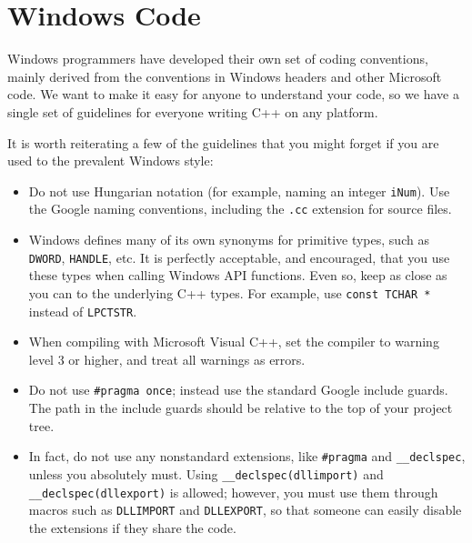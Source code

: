 
\section{Windows Code}\label{sec:windows-code}
Windows programmers have developed their own set of coding conventions, mainly derived from the conventions in Windows headers and other Microsoft code. We want to make it easy for anyone to understand your code, so we have a single set of guidelines for everyone writing C++ on any platform.

It is worth reiterating a few of the guidelines that you might forget if you are used to the prevalent Windows style:
\begin{itemize}
    \item Do not use Hungarian notation (for example, naming an integer \texttt{iNum}). Use the Google naming conventions, including the \texttt{.cc} extension for source files.
    \item Windows defines many of its own synonyms for primitive types, such as \texttt{DWORD}, \texttt{HANDLE}, etc. It is perfectly acceptable, and encouraged, that you use these types when calling Windows API functions. Even so, keep as close as you can to the underlying C++ types. For example, use \texttt{const TCHAR *} instead of \texttt{LPCTSTR}.
    \item When compiling with Microsoft Visual C++, set the compiler to warning level 3 or higher, and treat all warnings as errors.
    \item Do not use \texttt{#pragma once}; instead use the standard Google include guards. The path in the include guards should be relative to the top of your project tree.
    \item In fact, do not use any nonstandard extensions, like \texttt{#pragma} and \texttt{__declspec}, unless you absolutely must. Using \texttt{__declspec(dllimport)} and \texttt{__declspec(dllexport)} is allowed; however, you must use them through macros such as \texttt{DLLIMPORT} and \texttt{DLLEXPORT}, so that someone can easily disable the extensions if they share the code.
\end{itemize}
